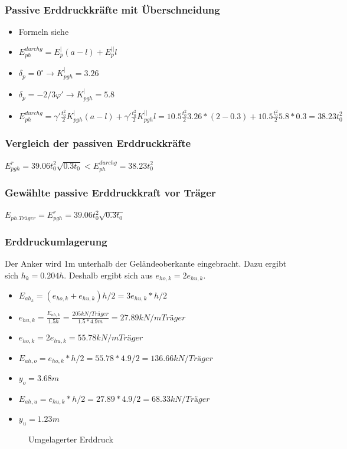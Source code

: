 \documentclass[11pt,fleqn,a4paper,halfparskip]{article}
\begin{document}
\subsubsection*{Passive Erddruckkräfte mit Überschneidung}
\begin{itemize}
\item[] Formeln siehe \cite[S.93]{wsp}
\item[] $E_{ph}^{durchg} = E_p^|(a-l)+E_p^{||}l $
\item[] $\delta_p = 0^\circ \rightarrow K^|_{pgh} = 3.26 $
\item[] $\delta_p = -2/3\varphi' \rightarrow K^|_{pgh} = 5.8 $
\item[] $E_{ph}^{durchg} = \gamma' \frac{t_0^2}{2}K^|_{pgh}(a-l) + \gamma' \frac{t_0^2}{2}K^{||}_{pgh} l = 10.5 \frac{t_0^2}{2}3.26*(2-0.3) + 10.5\frac{t_0^2}{2}5.8*0.3 = 38.23t_0^2$
\end{itemize}
\subsubsection*{Vergleich der passiven Erddruckkräfte}
$E^r_{pgh} =  39.06t_0^2\sqrt{0.3t_0} < E_{ph}^{durchg}  = 38.23t_0^2$
\subsubsection*{Gewählte passive Erddruckkraft vor Träger}
$E_{ph.Träger} = E^r_{pgh} =  39.06t_0^2\sqrt{0.3t_0}$
\newpage
\subsubsection{Erddruckumlagerung}
Der Anker wird 1m unterhalb der Geländeoberkante eingebracht. Dazu ergibt sich $h_k = 0.204h$. Deshalb ergibt sich aus \cite[S.137]{wsp} $e_{ho,k} = 2e_{hu,k}$.
\begin{itemize}
\item[] $E_{ah_k} = (e_{ho,k} + e_{hu,k})h/2 = 3e_{hu,k}* h/2 $
\item[] $e_{hu,k} = \frac{E_{ah,k}}{1.5h} = \frac{205kN/Träger}{1.5*4.9m} = 27.89kN/m Träger$
\item[] $e_{ho,k} = 2 e_{hu,k} = 55.78kN/m Träger$
\item[] $E_{ah,o} = e_{ho,k}*h/2 = 55.78*4.9/2 = 136.66kN/Träger$
\item[] $y_o = 3.68m$
\item[] $E_{ah,u} = e_{hu,k}*h/2 = 27.89*4.9/2 = 68.33kN/Träger$
\item[] $y_u = 1.23m$
\end{itemize}
\begin{figure}[h]
\vspace{10cm}
\caption[Umgelagerter Erddruck Aufgabe 2]{Umgelagerter Erddruck \cite{me}}
\end{figure}
\newpage
\end{document}
